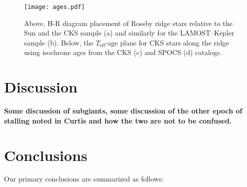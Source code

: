 \documentclass[linenumbers,tighten,trackchanges,twocolumn]{aastex631}
\newcommand{\teff}{\ensuremath{T_{\mathrm{eff}}}\xspace}
\begin{document}
\begin{figure*}
    \centering
    \texttt{[image: ages.pdf]}
    \caption{Above, H-R diagram placement of Rossby ridge stars relative to the Sun and the CKS sample (a) and similarly for the LAMOST--Kepler sample (b). Below, the \teff-age plane for CKS stars along the ridge using isochrone ages from the CKS (c) and SPOCS (d) catalogs.}
    \label{fig:ages}
\end{figure*}

\section{Discussion} \label{sec:discussion}
\textbf{Some discussion of subgiants, some discussion of the other epoch of stalling noted in Curtis and how the two are not to be confused.}

\section{Conclusions} \label{sec:conclusions}

Our primary conclusions are summarized as follows:
\end{document}
